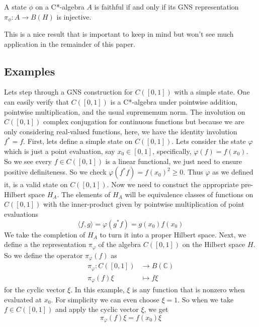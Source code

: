 \begin{theorem}
    A state $\phi$ on a C*-algebra $A$ is faithful if and only if its GNS representation
    $\pi_\phi: A \to B(H)$ is injective.
\end{theorem}

This is a nice result that is important to keep in mind but won't see much application
in the remainder of this paper.


\subsection{Examples}
\begin{example}
Lets step through a GNS construction for \( C([0,1]) \) with a simple state. One
can easily verify that $C([0,1])$ is a C*-algebra under pointwise addition, pointwise
multiplication, and the usual suprememum norm. The involution on $C([0,1])$ complex
conjugation for continuous functions but because we are only considering real-valued
functions, here, we have the identity involution $f^*=f$. First, lets define a simple state
on $C([0,1])$. Lets consider the state $\varphi$ which is just a point evaluation,
say $x_0 \in [0,1]$, specifically, $\varphi(f) = f(x_0)$. So we see every $f \in C([0,1])$
is a linear functional, we just need to ensure positive definiteness. So we check
$\varphi(f^*f) = f(x_0)^2 \ge 0$. Thus $\varphi$ as we defined it, is a valid state
on $C([0,1])$. Now we need to constuct the appropriate pre-Hilbert space $H_A$.
The elements of $H_A$ will be equivalence classes of functions on $C([0,1])$
with the inner-product given by pointwise multiplication of point evaluations
\begin{equation}
    \langle f,g \rangle= \varphi(g^*f) = g(x_0)f(x_0)
\end{equation}
We take the completion of $H_A$ to turn it into a proper Hilbert space.
Next, we define a the representation $\pi_\varphi$ of the algebra $C([0,1])$ on
the Hilbert space $H$. So we define the operator $\pi_\varphi (f)$ as
\begin{align}
    \pi_\varphi: C([0,1]) &\to B(\mathbb{C})\\
    \pi_\varphi (f)\xi &\mapsto f \xi
\end{align}
for the cyclic vector $\xi$. In this example, $\xi$ is any function
that is nonzero when evaluated at $x_0$. For simplicity we can even choose $\xi = 1$.
So when we take $f \in C([0,1])$ and apply the cyclic vector $\xi$, we get
\begin{equation}
    \pi_\varphi (f) \xi = f(x_0) \xi

\end{equation}
\end{example}
